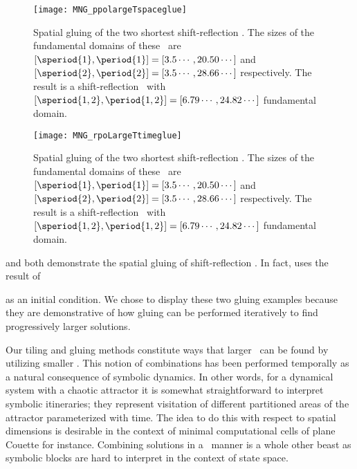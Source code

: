 \begin{figure}
\centering
\begin{minipage}[height=.4\textheight]{.66\textwidth}
\centering
\texttt{[image: MNG\_ppolargeTspaceglue]}
\end{minipage}
\caption{ \label{fig:MNGppo12spaceglue1}
Spatial gluing of the two shortest shift-reflection
\twots. The sizes of the fundamental domains of these
\twots\ are
$[\speriod{1},\period{1}]=[3.5\cdots,20.50\cdots]$
and
$[\speriod{2},\period{2}]=[3.5\cdots,28.66\cdots]$
respectively.
The result is a
shift-reflection \twot\ with
$[\speriod{1,2},\period{1,2}]=[6.79\cdots,24.82\cdots]$
fundamental domain.
}
\end{figure}


\begin{figure}
\centering
\begin{minipage}[height=.4\textheight]{.66\textwidth}
\centering
\texttt{[image: MNG\_rpoLargeTtimeglue]}
\end{minipage}
\caption{ \label{fig:MNGppo12spaceglue2}
Spatial gluing of the two shortest shift-reflection
\twots. The sizes of the fundamental domains of these
\twots\ are
$[\speriod{1},\period{1}]=[3.5\cdots,20.50\cdots]$
and
$[\speriod{2},\period{2}]=[3.5\cdots,28.66\cdots]$
respectively.
The result is a
shift-reflection \twot\ with
$[\speriod{1,2},\period{1,2}]=[6.79\cdots,24.82\cdots]$
fundamental domain.
}
\end{figure}

and 
both demonstrate the spatial gluing
of shift-reflection \twots. In fact, 
uses the result of

as an initial
condition. We chose to display these two gluing examples
because they are demonstrative of how gluing can be performed
iteratively to find progressively larger solutions.

Our tiling and gluing methods constitute ways that larger \twots\
can be found by utilizing smaller \twots. This notion of combinations
has been performed temporally\rf{DV03} as a natural
consequence of symbolic dynamics. In other words, for a dynamical system
with a chaotic attractor it is somewhat straightforward to interpret
symbolic itineraries; they represent visitation of different partitioned
areas of the attractor parameterized with time.
The idea to do this with
respect to spatial dimensions is desirable in the context of minimal
computational cells of plane Couette for instance. Combining solutions
in a \spt\ manner is a whole other beast as symbolic blocks are
hard to interpret in the context of state space.



